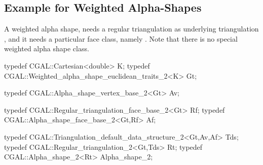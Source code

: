 
\subsection{Example for Weighted Alpha-Shapes\label{I1_SectWeightedAS2D}}

A weighted alpha shape, needs a regular triangulation as
underlying triangulation , and it needs a particular
face class, namely .
Note that there is no special weighted alpha shape class.

\begin{cprog}
typedef CGAL::Cartesian<double> K;
typedef CGAL::Weighted_alpha_shape_euclidean_traits_2<K> Gt;

typedef CGAL::Alpha_shape_vertex_base_2<Gt> Av;

typedef CGAL::Regular_triangulation_face_base_2<Gt> Rf;
typedef CGAL::Alpha_shape_face_base_2<Gt,Rf>  Af;

typedef CGAL::Triangulation_default_data_structure_2<Gt,Av,Af> Tds;
typedef CGAL::Regular_triangulation_2<Gt,Tds> Rt;
typedef CGAL::Alpha_shape_2<Rt> Alpha_shape_2;
\end{cprog}
